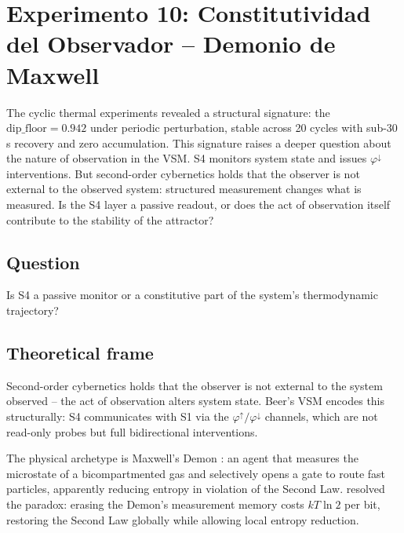 \documentclass[11pt, a4paper]{article}
\begin{document}
\FloatBarrier
\section{Experimento 10: Constitutividad del Observador -- Demonio de Maxwell}
\label{sec:maxwell}

The cyclic thermal experiments revealed a structural signature: the
$\text{dip\_floor} = 0.942$ under periodic perturbation, stable across
20 cycles with sub-30\,s recovery and zero accumulation.
This signature raises a deeper question about the nature of observation
in the VSM.
S4 monitors system state and issues $\varphi^\downarrow$ interventions.
But second-order cybernetics \citep{vonfoerster1979cybernetics} holds that the observer
is not external to the observed system: structured measurement changes what
is measured.
Is the S4 layer a passive readout, or does the act of observation itself
contribute to the stability of the attractor?

\subsection*{Question}
Is S4 a passive monitor or a constitutive part of the system's thermodynamic
trajectory?

\subsection{Theoretical frame}

Second-order cybernetics \citep{vonfoerster1979cybernetics} holds that the observer is not
external to the system observed -- the act of observation alters system state.
Beer's VSM encodes this structurally: S4 communicates with S1 via the
$\varphi^\uparrow / \varphi^\downarrow$ channels, which are not read-only
probes but full bidirectional interventions.

The physical archetype is Maxwell's Demon \citep{maxwell1871theory}: an agent that
measures the microstate of a bicompartmented gas and selectively opens a gate
to route fast particles, apparently reducing entropy in violation of the Second
Law.  \citet{landauer1961irreversibility} resolved the paradox: erasing the Demon's measurement
memory costs $kT \ln 2$ per bit, restoring the Second Law globally while
allowing local entropy reduction.
\end{document}
